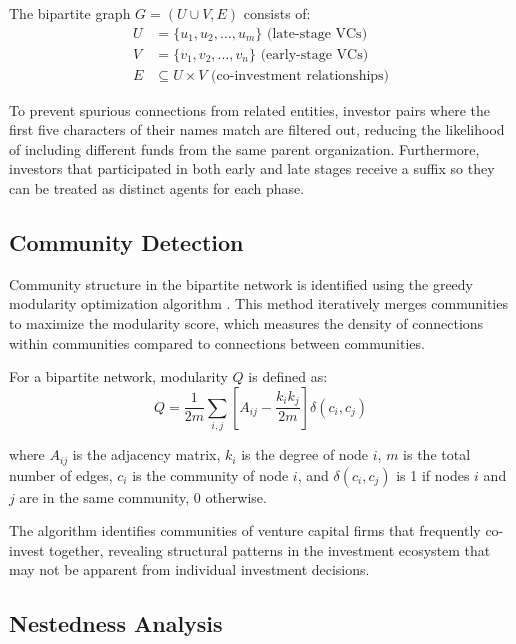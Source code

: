 The bipartite graph $G = (U \cup V, E)$ consists of:
\begin{align}
U &= \{u_1, u_2, \ldots, u_m\} \text{ (late-stage VCs)} \\
V &= \{v_1, v_2, \ldots, v_n\} \text{ (early-stage VCs)} \\
E &\subseteq U \times V \text{ (co-investment relationships)}
\end{align}

To prevent spurious connections from related entities, investor pairs where the first five characters of their names match are filtered out, reducing the likelihood of including different funds from the same parent organization. Furthermore, investors that participated in both early and late stages receive a suffix so they can be treated as distinct agents for each phase.


\subsection{Community Detection}

Community structure in the bipartite network is identified using the greedy modularity optimization algorithm \cite{Borgatti2011}. This method iteratively merges communities to maximize the modularity score, which measures the density of connections within communities compared to connections between communities.

For a bipartite network, modularity $Q$ is defined as:
\begin{equation}
Q = \frac{1}{2m} \sum_{i,j} \left[ A_{ij} - \frac{k_i k_j}{2m} \right] \delta(c_i, c_j)
\end{equation}

where $A_{ij}$ is the adjacency matrix, $k_i$ is the degree of node $i$, $m$ is the total number of edges, $c_i$ is the community of node $i$, and $\delta(c_i, c_j)$ is 1 if nodes $i$ and $j$ are in the same community, 0 otherwise.

The algorithm identifies communities of venture capital firms that frequently co-invest together, revealing structural patterns in the investment ecosystem that may not be apparent from individual investment decisions.

\subsection{Nestedness Analysis}

